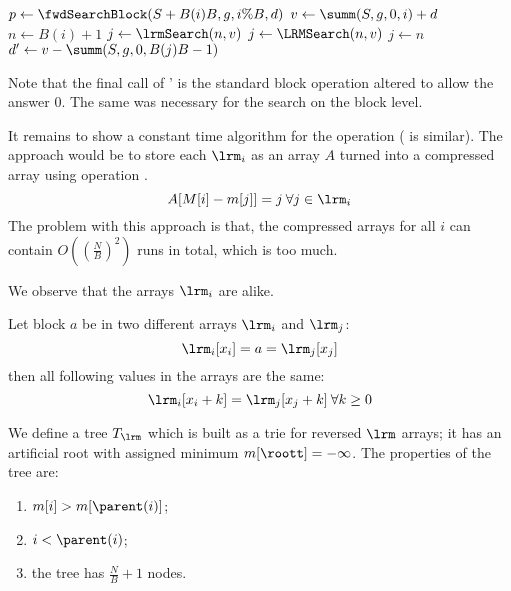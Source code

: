 \begin{algorithm}
\begin{algorithmic}
	\State $p \gets \fwdSearchBlock(S + B(i) B, g, i \% B, d)$ 
		\State {}
	\Else
		\State $v \gets \summ(S, g, 0, i) + d$
		\State $n \gets B(i) + 1$
			\State $j \gets \lrmSearch(n, v)$
			\State $j \gets \LRMSearch(n, v)$
		\Else
			\State $j \gets n$
		\EndIf
		 
			\State {}
		\Else
			\State $d' \gets v - \summ(S, g, 0, B(j) B - 1)$
			\State {}
		\EndIf
	\EndIf
\EndFunction
\end{algorithmic}
\end{algorithm}

Note that the final call of \fwdSearchBlock{}' is the standard block operation \fwdSearchBlock{} altered to allow the answer $0$.
The same was necessary for the search on the block level.

\bigbreak

It remains to show a constant time algorithm for the operation \lrmSearch{} (\LRMSearch{} is similar).
The \naive{} approach would be to store each $\lrm_i$ as an array $A$ turned into a compressed array using operation \succ{}.
$$ A[M[i] - m[j]] = j \:\forall j \in \lrm_i$$
The problem with this approach is that, the compressed arrays for all $i$ can contain $O\left(\left(\frac{N}{B}\right)^2\right)$ runs in total, which is too much.

\bigbreak

We observe that the arrays $\lrm_i$ are alike.
\begin{lemma}
	Let block $a$ be in two different arrays $\lrm_i$ and $\lrm_j$: 
	$$\lrm_i[x_i] = a = \lrm_j[x_j]$$
	then all following values in the arrays are the same:
	$$ \lrm_i[x_i + k] = \lrm_j[x_j + k] \:\forall k \ge 0 $$
\end{lemma}

\label{Tlrm} We define a tree $T_{\lrm}$ which is built as a trie for reversed $\lrm$ arrays; it has an artificial root with assigned minimum $m[\roott] = -\infty$.
The properties of the tree are:
\begin{enumerate}
	\item $m[i] > m[\parent(i)]$;
	\item $i < \parent(i)$;
	\item the tree has $\frac{N}{B} + 1$ nodes.
\end{enumerate}

